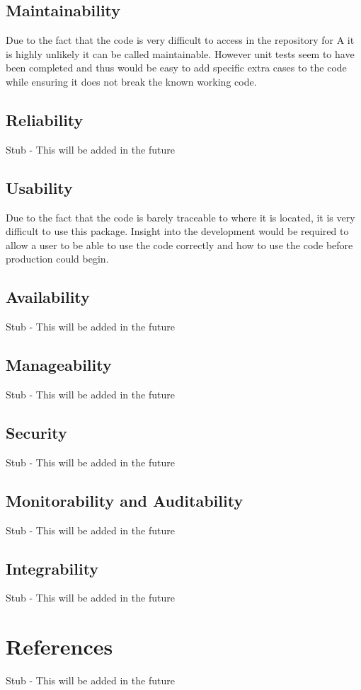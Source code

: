 \documentclass[12pt]{article}
\begin{document}
\subsection{Maintainability}
Due to the fact that the code is very difficult to access in the repository for A it is highly unlikely it can be called maintainable. However unit tests seem to have been completed and thus would be easy to add specific extra cases to the code while ensuring it does not break the known working code.
\subsection{Reliability}
Stub - This will be added in the future
\subsection{Usability}
Due to the fact that the code is barely traceable to where it is located, it is very difficult to use this package. Insight into the development would be required to allow a user to be able to use the code correctly and how to use the code before production could begin.
\subsection{Availability}
Stub - This will be added in the future

\subsection{Manageability}
Stub - This will be added in the future
\subsection{Security}
Stub - This will be added in the future
\subsection{Monitorability and Auditability}
Stub - This will be added in the future
\subsection{Integrability}
Stub - This will be added in the future

\section{References}
Stub - This will be added in the future
\end{document}
